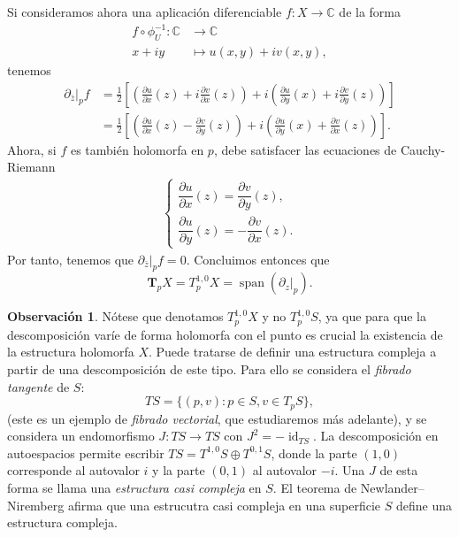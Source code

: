 \documentclass[autocontact]{gaceta}
\theoremstyle{definition} \newtheorem{defn}[thm]{Definición}
\theoremstyle{definition} \newtheorem{ejemplo}[thm]{Ejemplo}
\theoremstyle{definition} \newtheorem{ejercicio}[thm]{Ejercicio}
\newtheorem{obs}[thm]{Observación}
\def\CC{\mathbb{C}}
\DeclareMathOperator{\id}{id}
\DeclareMathOperator{\Span}{span}
\begin{document}
  Si consideramos ahora una aplicación diferenciable $f:X\rightarrow \CC$ de la forma
  \begin{align*}
    f\circ \phi_U^{-1} :\CC &\longrightarrow \CC\\ 
      x+iy &\longmapsto u(x,y) + i v(x,y), 
    \end{align*}
    tenemos
    \begin{align*}
      \partial_{\bar{z}}|_p f &= \frac{1}{2} \left[ \left( \frac{\partial u}{\partial x}(z) + i \frac{\partial v}{\partial x}(z) \right) + i\left( \frac{\partial u}{\partial y}(x) + i \frac{\partial v}{\partial y}(z) \right) \right] \\
 &= \frac{1}{2} \left[ \left( \frac{\partial u}{\partial x}(z) -  \frac{\partial v}{\partial y}(z) \right) + i\left( \frac{\partial u}{\partial y}(x) +  \frac{\partial v}{\partial x}(z) \right) \right].
    \end{align*}
    Ahora, si $f$ es también holomorfa en $p$, debe satisfacer las ecuaciones de Cauchy-Riemann
    \begin{align*}
      \begin{cases}
      \dfrac{\partial u}{\partial x}(z) = \dfrac{\partial v}{\partial y}(z), \\
      \dfrac{\partial u}{\partial y}(z) = -\dfrac{\partial v}{\partial x}(z).
      \end{cases}
    \end{align*}
    Por tanto, tenemos que $\partial_{\bar{z}}|_p f = 0$. Concluimos entonces que 
    \begin{equation*}
      \mathbf{T}_p X = T^{1,0}_p X = \Span(\partial_z|_p).
    \end{equation*}

    \begin{obs}
      Nótese que denotamos $T_p^{1,0}X$ y no $T_p^{1,0}S$, ya que para que la descomposición varíe de forma holomorfa con el punto es crucial la existencia de la estructura holomorfa $X$. Puede tratarse de definir una estructura compleja a partir de una descomposición de este tipo. Para ello se considera el \emph{fibrado tangente} de $S$:
      \begin{equation*}
	TS = \{(p,v) : p \in S, v\in T_p S\},
      \end{equation*}
      (este es un ejemplo de \emph{fibrado vectorial}, que estudiaremos más adelante), y se considera un endomorfismo $J:TS \rightarrow TS$ con $J^2=-\id_{TS}$. La descomposición en autoespacios permite escribir $TS= T^{1,0} S \oplus T^{0,1} S$, donde la parte $(1,0)$ corresponde al autovalor $i$ y la parte $(0,1)$ al autovalor $-i$. Una $J$ de esta forma se llama una \emph{estructura casi compleja} en $S$. El teorema de Newlander--Niremberg afirma que una estrucutra casi compleja en una superficie $S$ define una estructura compleja.
    \end{obs}
\end{document}
